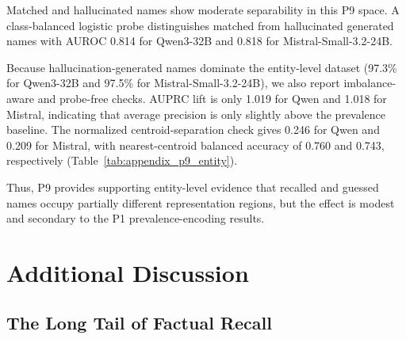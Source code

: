 \documentclass[11pt]{article}
\begin{document}
Matched and hallucinated names show moderate separability in this P9 space. A class-balanced logistic probe distinguishes matched from hallucinated generated names with AUROC 0.814 for Qwen3-32B and 0.818 for Mistral-Small-3.2-24B.

Because hallucination-generated names dominate the entity-level dataset (97.3\% for Qwen3-32B and 97.5\% for Mistral-Small-3.2-24B), we also report imbalance-aware and probe-free checks. AUPRC lift is only 1.019 for Qwen and 1.018 for Mistral, indicating that average precision is only slightly above the prevalence baseline. The normalized centroid-separation check gives 0.246 for Qwen and 0.209 for Mistral, with nearest-centroid balanced accuracy of 0.760 and 0.743, respectively (Table~\ref{tab:appendix_p9_entity}).

Thus, P9 provides supporting entity-level evidence that recalled and guessed names occupy partially different representation regions, but the effect is modest and secondary to the P1 prevalence-encoding results.

\begin{table}[t]
\centering
\captionsetup{font=small}
\footnotesize

\caption{Entity-level P9 analysis. Each row is a generated author name labeled as matched or hallucinated. AUPRC lift adjusts the average precision for the class-imbalance baseline; Norm. centroid and NC bal. acc. summarize centroid-based separation.}
\label{tab:appendix_p9_entity}
\end{table}

\section{Additional Discussion}
\label{sec:discussion}

\subsection{The Long Tail of Factual Recall}
\end{document}
